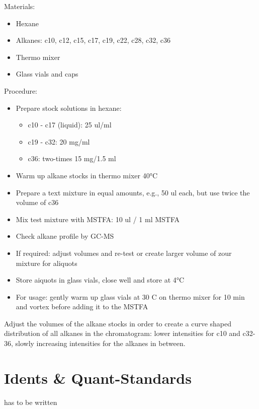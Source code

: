 \documentclass[]{book}
\providecommand{\tightlist}{%
  \setlength{\itemsep}{0pt}\setlength{\parskip}{0pt}}
\begin{document}
Materials:

\begin{itemize}
\tightlist
\item
  Hexane
\item
  Alkanes: c10, c12, c15, c17, c19, c22, c28, c32, c36
\item
  Thermo mixer
\item
  Glass vials and caps
\end{itemize}

Procedure:

\begin{itemize}
\tightlist
\item
  Prepare stock solutions in hexane:

  \begin{itemize}
  \tightlist
  \item
    c10 - c17 (liquid): 25 ul/ml
  \item
    c19 - c32: 20 mg/ml
  \item
    c36: two-times 15 mg/1.5 ml
  \end{itemize}
\item
  Warm up alkane stocks in thermo mixer 40°C
\item
  Prepare a text mixture in equal amounts, e.g., 50 ul each, but use twice the volume of c36
\item
  Mix test mixture with MSTFA: 10 ul / 1 ml MSTFA
\item
  Check alkane profile by GC-MS
\item
  If required: adjust volumes and re-test or create larger volume of zour mixture for aliquots
\item
  Store aiquots in glass vials, close well and store at 4°C
\item
  For usage: gently warm up glass vials at 30 C on thermo mixer for 10 min and vortex before adding it to the MSTFA
\end{itemize}

Adjust the volumes of the alkane stocks in order to create a curve shaped distribution of all alkanes in the chromatogram: lower intensities for c10 and c32-36, slowly increasing intensities for the alkanes in between.

\hypertarget{standards}{%
\section{Idents \& Quant-Standards}\label{standards}}

has to be written
\end{document}
